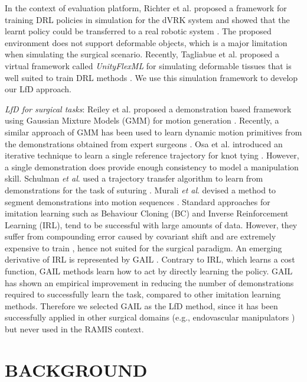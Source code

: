 \documentclass[letterpaper, 10 pt, conference]{ieeeconf}
\begin{document}
In the context of evaluation platform, Richter et al. proposed a framework for training DRL policies in simulation for the dVRK system and showed that the learnt policy could be transferred to a real robotic system \cite{richter2019open}. The proposed environment does not support deformable objects, which is a major limitation when simulating the surgical scenario. Recently, Tagliabue et al. proposed a virtual framework called \textit{UnityFlexML} for simulating deformable tissues that is well suited to train DRL methods \cite{tagliabue2020soft}. We use this simulation framework to develop our LfD approach.  

\textit{LfD for surgical tasks}: 
Reiley et al. proposed a demonstration based framework using Gaussian Mixture Models (GMM) for motion generation \cite{reiley2010motion}. Recently, a similar approach of GMM has been used to learn dynamic motion primitives from the demonstrations obtained from expert surgeons \cite{su2021toward}. Osa et al. introduced an iterative technique to learn a single reference trajectory for knot tying \cite{osa2017online}. However, a single demonstration does provide enough consistency to model a manipulation skill. Schulman \textit{et al}. used a trajectory transfer algorithm to learn from demonstrations for the task of suturing \cite{schulman2013case}. Murali \textit{et al}. devised a method to segment demonstrations into motion sequences \cite{murali2015learning}. 
Standard approaches for imitation learning such as Behaviour Cloning (BC) and Inverse Reinforcement Learning (IRL), tend to be successful with large amounts of data. However, they suffer from compounding error caused by covariant shift and are extremely expensive to train \cite{ibarz2021train}, hence not suited for the surgical paradigm. 
An emerging derivative of IRL is represented by GAIL \cite{ho2016generative}. Contrary to IRL, which learns a cost function, GAIL methods learn how to act by directly learning the policy. GAIL has shown an empirical improvement in reducing the number of demonstrations required to successfully learn the task, compared to other imitation learning methods. 
Therefore we selected GAIL as the LfD method, since it has been successfully applied in other surgical domains (e.g., endovascular manipulators \cite{chi2020collaborative}) but never used in the RAMIS context.

\section{BACKGROUND\label{sec:background}}
\end{document}
